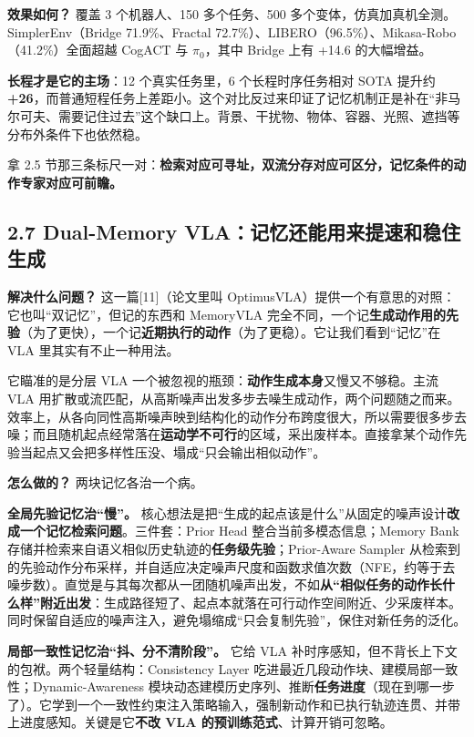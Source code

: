 \documentclass[
  chinese,
]{ctexart}
\begin{document}
\textbf{效果如何？} 覆盖 3 个机器人、150 多个任务、500
多个变体，仿真加真机全测。SimplerEnv（Bridge 71.9\%、Fractal
72.7\%）、LIBERO（96.5\%）、Mikasa-Robo（41.2\%）全面超越 CogACT 与
\(\pi_0\)，其中 Bridge 上有 +14.6 的大幅增益。

\textbf{长程才是它的主场}：12 个真实任务里，6 个长程时序任务相对 SOTA
提升约
\textbf{+26}，而普通短程任务上差距小。这个对比反过来印证了记忆机制正是补在``非马尔可夫、需要记住过去''这个缺口上。背景、干扰物、物体、容器、光照、遮挡等分布外条件下也依然稳。

拿 2.5
节那三条标尺一对：\textbf{检索对应可寻址，双流分存对应可区分，记忆条件的动作专家对应可前瞻。}

\subsection{2.7 Dual-Memory
VLA：记忆还能用来提速和稳住生成}\label{dual-memory-vlaux8bb0ux5fc6ux8fd8ux80fdux7528ux6765ux63d0ux901fux548cux7a33ux4f4fux751fux6210}

\textbf{解决什么问题？} 这一篇{[}11{]}（论文里叫
OptimusVLA）提供一个有意思的对照：它也叫``双记忆''，但记的东西和
MemoryVLA
完全不同，一个记\textbf{生成动作用的先验}（为了更快），一个记\textbf{近期执行的动作}（为了更稳）。它让我们看到``记忆''在
VLA 里其实有不止一种用法。

它瞄准的是分层 VLA
一个被忽视的瓶颈：\textbf{动作生成本身}又慢又不够稳。主流 VLA
用扩散或流匹配，从高斯噪声出发多步去噪生成动作，两个问题随之而来。效率上，从各向同性高斯噪声映到结构化的动作分布跨度很大，所以需要很多步去噪；而且随机起点经常落在\textbf{运动学不可行}的区域，采出废样本。直接拿某个动作先验当起点又会把多样性压没、塌成``只会输出相似动作''。

\textbf{怎么做的？} 两块记忆各治一个病。

\textbf{全局先验记忆治``慢''。}
核心想法是把``生成的起点该是什么''从固定的噪声设计\textbf{改成一个记忆检索问题}。三件套：Prior
Head 整合当前多模态信息；Memory Bank
存储并检索来自语义相似历史轨迹的\textbf{任务级先验}；Prior-Aware Sampler
从检索到的先验动作分布采样，并自适应决定噪声尺度和函数求值次数（NFE，约等于去噪步数）。直觉是与其每次都从一团随机噪声出发，不如\textbf{从``相似任务的动作长什么样''附近出发}：生成路径短了、起点本就落在可行动作空间附近、少采废样本。同时保留自适应的噪声注入，避免塌缩成``只会复制先验''，保住对新任务的泛化。

\textbf{局部一致性记忆治``抖、分不清阶段''。} 它给 VLA
补时序感知，但不背长上下文的包袱。两个轻量结构：Consistency Layer
吃进最近几段动作块、建模局部一致性；Dynamic-Awareness
模块动态建模历史序列、推断\textbf{任务进度}（现在到哪一步了）。它学到一个一致性约束注入策略输入，强制新动作和已执行轨迹连贯、并带上进度感知。关键是它\textbf{不改
VLA 的预训练范式}、计算开销可忽略。
\end{document}
